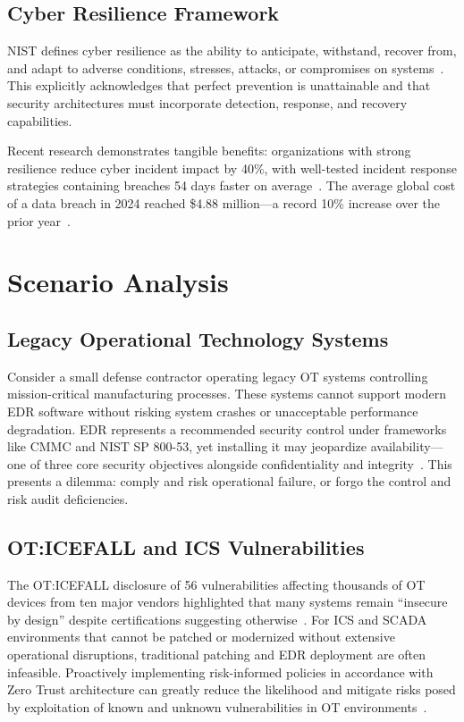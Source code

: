 \documentclass[sigconf,nonacm]{acmart}
\begin{document}
\subsection{Cyber Resilience Framework}

NIST defines cyber resilience as the ability to anticipate, withstand, recover from, and
adapt to adverse conditions, stresses, attacks, or compromises on
systems~\cite{nist2021resilience}. This explicitly acknowledges that perfect prevention
is unattainable and that security architectures must incorporate detection, response, and
recovery capabilities.

Recent research demonstrates tangible benefits: organizations with strong resilience
reduce cyber incident impact by 40\%, with well-tested incident response strategies
containing breaches 54 days faster on average~\cite{zeronetworks2024}. The average
global cost of a data breach in 2024 reached \$4.88 million---a record 10\% increase
over the prior year~\cite{ibm2024breach}.

\section{Scenario Analysis}

\subsection{Legacy Operational Technology Systems}

Consider a small defense contractor operating legacy OT systems controlling
mission-critical manufacturing processes. These systems cannot support modern EDR
software without risking system crashes or unacceptable performance degradation. EDR
represents a recommended security control under frameworks like CMMC and NIST SP 800-53,
yet installing it may jeopardize availability---one of three core security objectives
alongside confidentiality and integrity~\cite{nist2020controls}. This presents a
dilemma: comply and risk operational failure, or forgo the control and risk audit
deficiencies.

\subsection{OT:ICEFALL and ICS Vulnerabilities}

The OT:ICEFALL disclosure of 56 vulnerabilities affecting thousands of OT devices from
ten major vendors highlighted that many systems remain ``insecure by design'' despite
certifications suggesting otherwise~\cite{claroty2024}. For ICS and SCADA environments
that cannot be patched or modernized without extensive operational disruptions,
traditional patching and EDR deployment are often infeasible. Proactively implementing
risk-informed policies in accordance with Zero Trust architecture can greatly reduce
the likelihood and mitigate risks posed by exploitation of known and unknown
vulnerabilities in OT environments~\cite{claroty2024,rockwell2024}.
\end{document}
